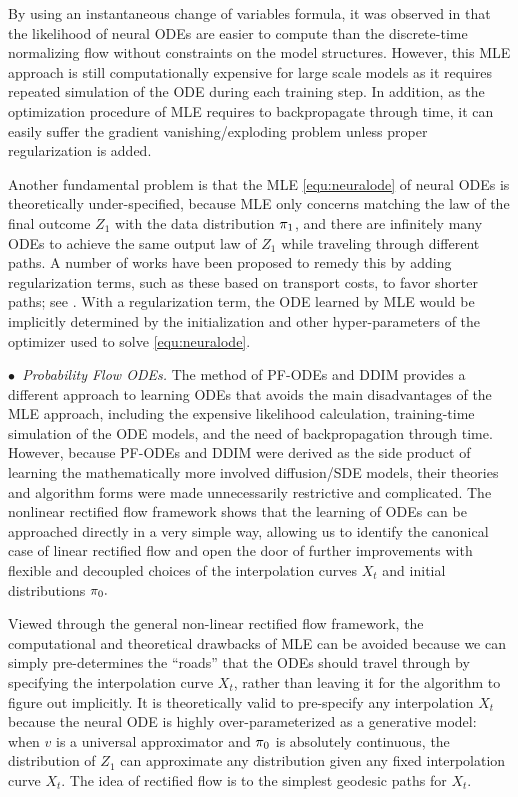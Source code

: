 By using  
an instantaneous change of variables formula, 
it was observed in \cite{chen2018neural} that the likelihood of neural ODEs
are easier to compute than the discrete-time normalizing flow without constraints on the model structures. 
However, this MLE approach is still computationally expensive for large scale models as it requires repeated simulation of the ODE during each training step.
In addition, 
as the optimization procedure of MLE requires to  backpropagate through time,
it can easily suffer the gradient vanishing/exploding problem unless proper regularization is added. 

Another fundamental problem is that 
the MLE \eqref{equ:neuralode}  of neural ODEs is theoretically under-specified, 
because MLE only concerns matching the law of the final outcome $Z_1$ with the data distribution ${\pi}_1$, and  there are infinitely many ODEs to achieve the same output law of $Z_1$ while traveling through different paths. 
A number of works have been proposed to remedy  this by adding 
regularization terms, such as these based on transport costs, to favor shorter paths; see  \cite[][]{nichol2021improved, onken2021ot}. 
With a regularization term, the ODE learned by MLE would be implicitly determined by the initialization and other hyper-parameters of the optimizer used to solve \eqref{equ:neuralode}.  

\emph{$\bullet$~Probability Flow ODEs.}  
The method of PF-ODEs \cite{song2020score} and DDIM \cite{song2020denoising} provides a different approach to learning ODEs that avoids the main disadvantages of the MLE approach, including %
the expensive likelihood calculation, training-time simulation of the ODE models, and the need of backpropagation through time.  %
However,
because PF-ODEs and DDIM 
were derived as the side product of learning the mathematically more involved diffusion/SDE models, 
their theories and algorithm forms were made 
unnecessarily restrictive and complicated. 
The nonlinear rectified flow framework shows that the 
learning of ODEs 
can be approached directly in a very simple way, allowing us to identify the canonical case of linear rectified flow  and open the door of further improvements with flexible and decoupled choices of the interpolation curves $X_t$ and initial distributions ${\pi}_0.$ 


 Viewed through the general non-linear rectified flow  framework, 
 the computational and theoretical drawbacks of MLE can be avoided because 
we can simply pre-determines the ``roads'' 
that the ODEs should travel through 
by specifying the interpolation curve $X_t$,  
rather than leaving it for the algorithm to figure out implicitly.  
It is theoretically valid to pre-specify any interpolation  $X_t$ 
because the neural ODE is highly over-parameterized as a generative model: when $v$ is a universal approximator and ${\pi}_0$ is absolutely continuous, 
the distribution of $Z_1$ can  approximate any distribution given any fixed interpolation curve $X_t$. The idea of rectified flow is to the 
simplest geodesic paths for $X_t$. %
 






